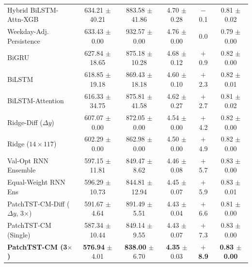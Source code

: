 \documentclass[5p,twocolumn,authoryear]{elsarticle}
\begin{document}
\begin{table}[t]
{\begin{tabular}{lccccc}
Hybrid BiLSTM-Attn-XGB & 634.21 $\pm$ 40.21 & 883.58 $\pm$ 41.86 & 4.70 $\pm$ 0.28 & $-$0.1 & 0.81 $\pm$ 0.02 \\
Weekday-Adj. Persistence & 633.43 $\pm$ 0.00 & 932.57 $\pm$ 0.00 & 4.76 $\pm$ 0.00 & 0.0 & 0.79 $\pm$ 0.00 \\
BiGRU & 627.84 $\pm$ 18.65 & 875.18 $\pm$ 10.28 & 4.68 $\pm$ 0.12 & $+$0.9 & 0.82 $\pm$ 0.00 \\
BiLSTM & 618.85 $\pm$ 19.18 & 869.43 $\pm$ 18.18 & 4.60 $\pm$ 0.10 & $+$2.3 & 0.82 $\pm$ 0.01 \\
BiLSTM-Attention & 616.33 $\pm$ 34.75 & 875.81 $\pm$ 41.58 & 4.62 $\pm$ 0.27 & $+$2.7 & 0.81 $\pm$ 0.02 \\
Ridge-Diff ($\Delta y$) & 607.07 $\pm$ 0.00 & 872.05 $\pm$ 0.00 & 4.54 $\pm$ 0.00 & $+$4.2 & 0.82 $\pm$ 0.00 \\
Ridge ($14 \times 117$) & 602.29 $\pm$ 0.00 & 862.98 $\pm$ 0.00 & 4.50 $\pm$ 0.00 & $+$4.9 & 0.82 $\pm$ 0.00 \\
Val-Opt RNN Ensemble & 597.15 $\pm$ 11.81 & 849.47 $\pm$ 8.62 & 4.46 $\pm$ 0.08 & $+$5.7 & 0.83 $\pm$ 0.00 \\
Equal-Weight RNN Ens & 596.29 $\pm$ 10.73 & 844.81 $\pm$ 12.94 & 4.45 $\pm$ 0.07 & $+$5.9 & 0.83 $\pm$ 0.01 \\
PatchTST-CM-Diff ($\Delta y$, 3$\times$) & 591.67 $\pm$ 4.64 & 891.49 $\pm$ 5.51 & 4.43 $\pm$ 0.04 & $+$6.6 & 0.81 $\pm$ 0.00 \\
PatchTST-CM (Single) & 587.34 $\pm$ 10.44 & 849.14 $\pm$ 9.55 & 4.43 $\pm$ 0.07 & $+$7.3 & 0.83 $\pm$ 0.00 \\
\textbf{PatchTST-CM (3$\times$)} & \textbf{576.94} $\pm$ 4.01 & \textbf{838.00} $\pm$ 6.70 & \textbf{4.35} $\pm$ 0.03 & \textbf{$+$8.9} & \textbf{0.83 $\pm$ 0.00} \\
\bottomrule
\end{tabular}%
}
\end{table}
\end{document}
